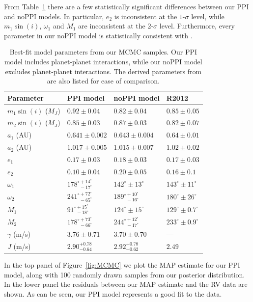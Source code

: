 From Table~\ref{tab:MCMC} there are a few statistically significant differences between our PPI and noPPI models. 
In particular, $e_2$ is inconsistent at the $1$-$\sigma$ level, while $m_1\sin(i)$, $\omega_1$ and $M_1$ are inconsistent at the $2$-$\sigma$ level.
Furthermore, every parameter in our noPPI model is statistically consistent with \R.

\begin{table}
\begin{tabular}{llll}
\hline \hline
Parameter & PPI model & noPPI model & R2012\\ 
 \hline \hline
 $m_1\sin(i)$ ($M_J$) & $0.92 \pm 0.04$ & $0.82 \pm 0.04$ & $0.85 \pm 0.05$ \\ 
 $m_2\sin(i)$ ($M_J$) & $0.85 \pm 0.03$ & $0.87 \pm 0.03$ & $0.82 \pm 0.07$ \\ 
 $a_1$ (AU) & $0.641 \pm 0.002$ & $0.643 \pm 0.004$ & $0.64 \pm 0.01$ \\
 $a_2$ (AU) & $1.017 \pm 0.005$ & $1.015 \pm 0.007$ & $1.02 \pm 0.02$\\
 $e_1$ & $0.17 \pm 0.03$ & $0.18 \pm 0.03$ & $0.17 \pm 0.03$\\
 $e_2$ & $0.10 \pm 0.04$ & $0.20 \pm 0.05$ & $0.16 \pm 0.1$\\
 $\omega_1$ & $178^{\circ +14^{\circ}}_{\ \ -17^{\circ}}$ & $142^{\circ} \pm 13^{\circ}$ & $143^{\circ} \pm 11^{\circ}$\\
 $\omega_2$ & $241^{\circ +72^{\circ}}_{\ \ -65^{\circ}}$ & $189^{\circ +10^{\circ}}_{\ \ -16^{\circ}}$ & $180^{\circ} \pm 26^{\circ}$\\
 $M_1$ & $91^{\circ +15^{\circ}}_{\ \ -18^{\circ}}$ & $124^{\circ} \pm 15^{\circ}$ & $129^{\circ} \pm 0.7^{\circ}$\\
 $M_2$ & $178^{\circ +73^{\circ}}_{\ \ -66^{\circ}}$ & $244^{\circ +12^{\circ}}_{\ \ -17^{\circ}}$ & $233^{\circ} \pm 0.9^{\circ}$\\
 $\gamma$ (m/s) & $3.76 \pm 0.71$ & $3.70 \pm 0.70$ & --- \\
 $J$ (m/s) & $2.90^{+0.78}_{-0.64}$ & $2.92^{+0.78}_{-0.62}$ & $2.49$\\
 \hline
\end{tabular}
\caption{Best-fit model parameters from our MCMC samples. Our PPI model includes planet-planet interactions, while our noPPI model excludes planet-planet interactions. The derived parameters from \R are also listed for ease of comparison.}
\label{tab:MCMC}
\end{table}

In the top panel of Figure~\ref{fig:MCMC} we plot the MAP estimate for our PPI model, along with 100 randomly drawn samples from our posterior distribution.
In the lower panel the residuals between our MAP estimate and the RV data are shown. 
As can be seen, our PPI model represents a good fit to the data. 

